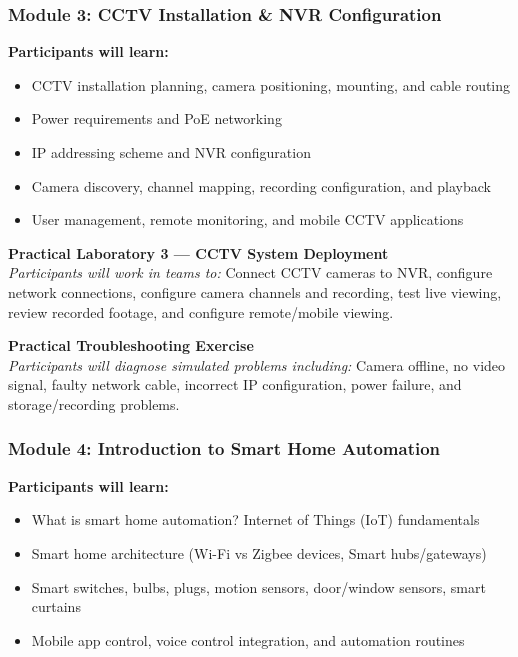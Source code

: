 \documentclass[11pt,a4paper]{article}
\begin{document}
\subsubsection{Module 3: CCTV Installation \& NVR Configuration}
\textbf{Participants will learn:}
\begin{itemize}
    \item CCTV installation planning, camera positioning, mounting, and cable routing
    \item Power requirements and PoE networking
    \item IP addressing scheme and NVR configuration
    \item Camera discovery, channel mapping, recording configuration, and playback
    \item User management, remote monitoring, and mobile CCTV applications
\end{itemize}

\vspace{4pt}
\begin{tcolorbox}[calloutbox]
\textbf{Practical Laboratory 3 — CCTV System Deployment}\\
\textit{Participants will work in teams to:} Connect CCTV cameras to NVR, configure network connections, configure camera channels and recording, test live viewing, review recorded footage, and configure remote/mobile viewing.
\end{tcolorbox}

\vspace{4pt}
\begin{tcolorbox}[calloutbox]
\textbf{Practical Troubleshooting Exercise}\\
\textit{Participants will diagnose simulated problems including:} Camera offline, no video signal, faulty network cable, incorrect IP configuration, power failure, and storage/recording problems.
\end{tcolorbox}

\subsubsection{Module 4: Introduction to Smart Home Automation}
\textbf{Participants will learn:}
\begin{itemize}
    \item What is smart home automation? Internet of Things (IoT) fundamentals
    \item Smart home architecture (Wi-Fi vs Zigbee devices, Smart hubs/gateways)
    \item Smart switches, bulbs, plugs, motion sensors, door/window sensors, smart curtains
    \item Mobile app control, voice control integration, and automation routines
\end{itemize}
\end{document}

